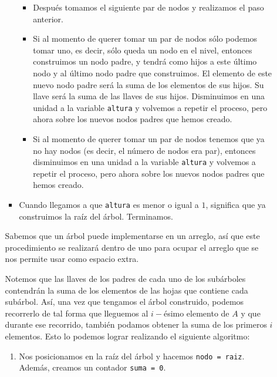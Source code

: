 \documentclass[letterpaper,11pt]{article}
\begin{document}
\begin{enumerate}
\begin{itemize}
\begin{itemize}
\begin{itemize}
                \item Después tomamos el siguiente par de nodos y realizamos 
                el paso anterior. 
                
                \item Si al momento de querer tomar un par de nodos sólo podemos 
                tomar uno, es decir, sólo queda un nodo en el nivel, entonces 
                construimos un nodo padre, y tendrá como hijos a este último nodo 
                y al último nodo padre que construimos. El elemento de este 
                nuevo nodo padre será la suma de los elementos de sus hijos. 
                Su llave será la suma de las llaves de sus hijos. Disminuimos 
                en una unidad a la variable \texttt{altura} y volvemos a repetir 
                el proceso, pero ahora sobre los nuevos nodos padres que hemos 
                creado.

                \item Si al momento de querer tomar un par de nodos tenemos 
                que ya no hay nodos (es decir, el número de nodos era par), 
                entonces disminuimos en una unidad a la variable \texttt{altura}
                y volvemos a repetir el proceso, pero ahora sobre los nuevos 
                nodos padres que hemos creado. 
            \end{itemize}

            \item Cuando llegamos a que \texttt{altura} es menor o igual a $1$, 
            significa que ya construimos la raíz del árbol. Terminamos.
        \end{itemize}

        Sabemos que un árbol puede implementarse en un arreglo, así que este 
        procedimiento se realizará dentro de uno para ocupar el arreglo que se 
        nos permite usar como espacio extra. 
        
        Notemos que las llaves de los padres de cada uno de los subárboles 
        contendrán la suma de los elementos de las hojas que contiene cada 
        subárbol. Así, una vez que tengamos el árbol construido, podemos 
        recorrerlo de tal forma que lleguemos al $i-$ésimo elemento de $A$
        y que durante ese recorrido, también podamos obtener la suma de los 
        primeros $i$ elementos. Esto lo podemos lograr realizando el siguiente 
        algoritmo:
        \begin{enumerate}
            \item Nos posicionamos en la raíz del árbol y hacemos 
            \texttt{nodo = raiz}. Además, creamos un contador \texttt{suma = 0}.


\end{enumerate}
\end{itemize}
\end{enumerate}
\end{document}
